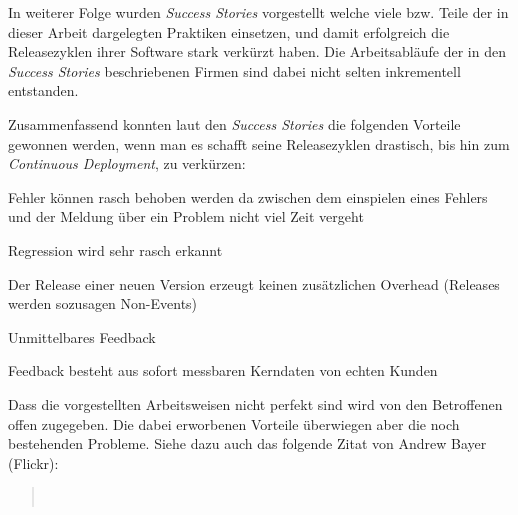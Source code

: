 In weiterer Folge wurden \emph{Success Stories} vorgestellt welche viele bzw.
Teile der in dieser Arbeit dargelegten Praktiken einsetzen, und damit
erfolgreich die Releasezyklen ihrer Software stark verkürzt haben. Die
Arbeitsabläufe der in den \emph{Success Stories} beschriebenen Firmen sind
dabei nicht selten inkrementell entstanden.

Zusammenfassend konnten laut den \emph{Success Stories} die folgenden Vorteile
gewonnen werden, wenn man es schafft seine Releasezyklen drastisch, bis hin
zum \emph{Continuous Deployment}, zu verkürzen:

\begin{itemize*}
    \item Fehler können rasch behoben werden da zwischen dem einspielen eines
          Fehlers und der Meldung über ein Problem nicht viel Zeit vergeht
    \item Regression wird sehr rasch erkannt
    \item Der Release einer neuen Version erzeugt keinen zusätzlichen Overhead
          (Releases werden sozusagen Non-Events) 
    \item Unmittelbares Feedback
    \item Feedback besteht aus sofort messbaren Kerndaten von echten Kunden
\end{itemize*}

Dass die vorgestellten Arbeitsweisen nicht perfekt sind wird von den
Betroffenen offen zugegeben. Die dabei erworbenen Vorteile überwiegen aber die
noch bestehenden Probleme. Siehe dazu auch das folgende Zitat von Andrew Bayer (Flickr):

\begin{quote}
~\cite{digg4}
\end{quote}
